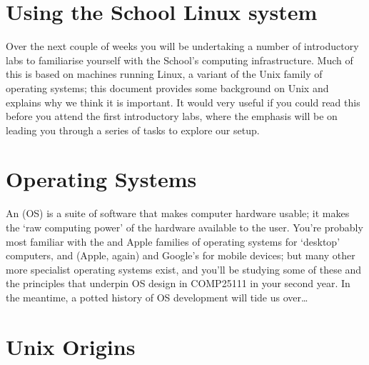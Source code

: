 \section{Using the School Linux system}

Over the next couple of weeks you will be undertaking a number of
introductory labs to familiarise yourself with the School's computing
infrastructure. Much of this is based on machines running Linux, a
variant of the Unix family of operating systems; this document
provides some background on Unix and explains why we think it is
important. It would very useful if you could read this before you
attend the first introductory labs, where the emphasis will be on
leading you through a series of tasks to explore our setup.

\section{Operating Systems}

An  (OS) is a suite of
software that makes computer hardware usable; it makes the `raw
computing power' of the hardware available to the user. You're
probably most familiar with
the  and
Apple  families of operating systems for
`desktop' computers, and  (Apple, again) and
Google's  for mobile
devices; but many other more specialist operating systems exist, and
you'll be studying some of these and the principles that underpin OS
design in COMP25111 in your second year. In the meantime, a potted
history of OS development will tide us over\ldots
 
\section{Unix Origins}
\label{sec:unix}

